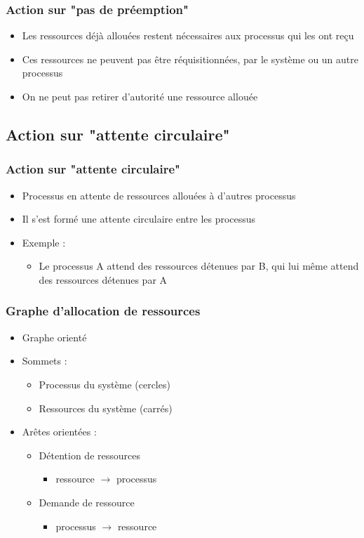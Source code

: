 \begin{frame}
\frametitle{Action sur "pas de préemption"}
\begin{itemize}
\item Les ressources déjà allouées restent nécessaires aux processus qui les ont reçu
\item Ces ressources ne peuvent pas être réquisitionnées, par le système ou un autre processus
\item On ne peut pas retirer d'autorité une ressource allouée
\end{itemize}
\end{frame}

\subsection{Action sur "attente circulaire"}

\begin{frame}
\frametitle{Action sur "attente circulaire"}
\begin{itemize}
\item Processus en attente de ressources allouées à d’autres processus
\item Il s’est formé une attente circulaire entre les processus
\item Exemple :
\begin{itemize}
\item Le processus A attend des ressources détenues par B, qui lui même attend des ressources détenues par A
\end{itemize}
\end{itemize}
\end{frame}

\begin{frame}
\frametitle{Graphe d’allocation de ressources}
\begin{itemize}
\item <1-> Graphe orienté
\item <2-> Sommets :
\begin{itemize}
\item Processus du système (cercles)
\item Ressources du système (carrés)
\end{itemize}
\item <3-> Arêtes orientées :
\begin{itemize}
\item Détention de ressources
\begin{itemize}
\item ressource $\to$ processus
\end{itemize}
\item Demande de ressource
\begin{itemize}
\item processus $\to$ ressource
\end{itemize}
\end{itemize}
\end{itemize}
\end{frame}

